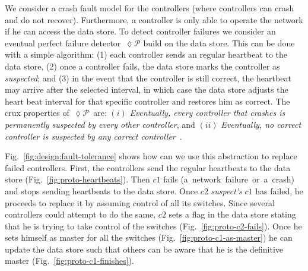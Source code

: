 We consider a crash fault model for the controllers (where controllers can crash and do not recover). Furthermore, a controller is only able to operate the network if he can access the data store. 
To detect controller failures we consider an eventual perfect failure detector~$\lozenge\mathscr{P}$ build on the data store. 
This can be done with a simple algorithm: (1) each controller sends an regular heartbeat to the data store, (2) once a controller fails, the data store marks the controller as \emph{suspected}; and (3) in the event that the controller is still correct, the heartbeat may arrive after the selected interval, in which case the data store adjusts the heart beat interval for that specific controller and restores him as correct. 
The  crux properties  of~$\lozenge\mathscr{P}$~are: $(i)$  \emph{Eventually, every controller that crashes is permanently suspected by every other controller}, and $(ii)$ \emph{Eventually, no correct controller is suspected by any correct controller}~\cite{2011itra.book.....C}.  

Fig.~\ref{fig:design:fault-tolerance} shows how can we use this abstraction to replace failed controllers. 
First, the controllers send the regular heartbeats to the data store (Fig.~\ref{fig:proto-heartbeats}). 
Then $c1$ fails \hbox{(a network failure or a crash)}  and  stops sending heartbeats to the data store.
Once  $c2$ \emph{suspect's} $c1$ has failed, he proceeds to replace it by assuming control of all its switches.  
Since several controllers could attempt to do the same, $c2$ sets a flag in the data store stating that he is trying to take control of the switches (Fig.~\ref{fig:proto-c2-fails}). 
Once he sets himself as master for all the switches (Fig.~\ref{fig:proto-c1-as-master}) he can update the data store such that others can be aware that he is the definitive master (Fig.~\ref{fig:proto-c1-finishes}). 

